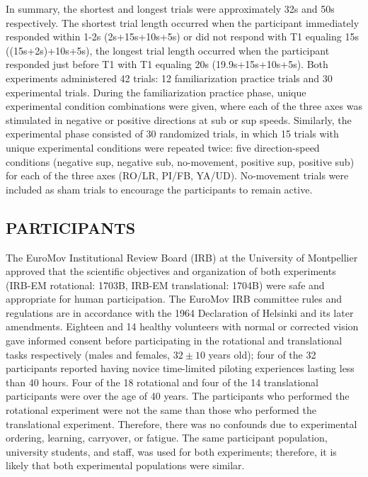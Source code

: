 \indent In summary, the shortest and longest trials were approximately 32s and 50s respectively. The shortest trial length occurred when the participant immediately responded within 1-2s (2s+15s+10s+5s) or did not respond with T1 equaling 15s ((15s+2s)+10s+5s), the longest trial length occurred when the participant responded just before T1 with T1 equaling 20s (19.9s+15s+10s+5s). Both experiments administered 42 trials: 12 familiarization practice trials and 30 experimental trials. During the familiarization practice phase, unique experimental condition combinations were given, where each of the three axes was stimulated in negative or positive directions at sub or sup speeds. Similarly, the experimental phase consisted of 30 randomized trials, in which 15 trials with unique experimental conditions were repeated twice: five direction-speed conditions (negative sup, negative sub, no-movement, positive sup, positive sub) for each of the three axes (RO/LR, PI/FB, YA/UD). No-movement trials were included as sham trials to encourage the participants to remain active.

\subsection{PARTICIPANTS}
The EuroMov Institutional Review Board (IRB) at the University of Montpellier approved that the scientific objectives and organization of both experiments (IRB-EM rotational: 1703B, IRB-EM translational: 1704B) were safe and appropriate for human participation. The EuroMov IRB committee rules and regulations are in accordance with the 1964 Declaration of Helsinki and its later amendments. Eighteen and 14 healthy volunteers with normal or corrected vision gave informed consent before participating in the rotational and translational tasks respectively (males and females, $32\pm10$ years old); four of the 32 participants reported having novice time-limited piloting experiences lasting less than 40 hours. Four of the 18 rotational and four of the 14 translational participants were over the age of 40 years. The participants who performed the rotational experiment were not the same than those who performed the translational experiment. Therefore, there was no confounds due to experimental ordering, learning, carryover, or fatigue. The same participant population, university students, and staff, was used for both experiments; therefore, it is likely that both experimental populations were similar.

